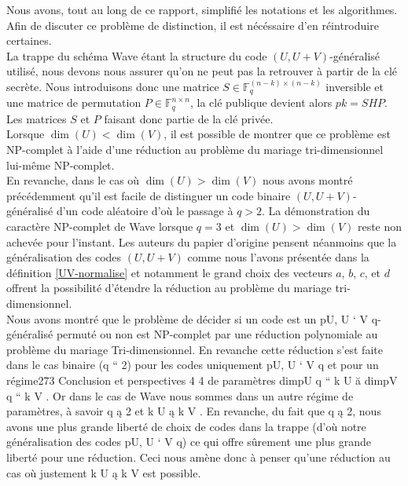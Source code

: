 \documentclass[12pt]{article}
\theoremstyle{plain}
\theoremstyle{definition}
\newcommand{\F}{\mathbb{F}}
\begin{document}
\noindent Nous avons, tout au long de ce rapport, simplifié les notations et les algorithmes. Afin de discuter ce problème de distinction, il est nécéssaire d'en réintroduire certaines. \\
La trappe du schéma Wave étant la structure du code $(U,U+V)$-généralisé utilisé, nous devons nous assurer qu'on ne peut pas la retrouver à partir de la clé secrète. Nous introduisons donc une matrice $S\in\F_q^{(n-k)\times(n-k)}$ inversible et une matrice de permutation $P\in\F_q^{n\times n}$, la clé publique devient alors $pk = SHP$. Les matrices $S$ et $P$ faisant donc partie de la clé privée.\\

\noindent Lorsque $\dim(U) < \dim(V)$, il est possible de montrer que ce problème est NP-complet à l'aide d'une réduction au problème du mariage tri-dimensionnel lui-même NP-complet. \\
En revanche, dans le cas où $\dim(U) > \dim(V)$ nous avons montré précédemment qu'il est facile de distinguer un code binaire $(U,U+V)$-généralisé d'un code aléatoire d'où le passage à $q>2$.
La démonstration du caractère NP-complet de Wave lorsque $q=3$ et $\dim(U) > \dim(V)$ reste non achevée pour l'instant.
Les auteurs du papier d'origine pensent néanmoins que la généralisation des codes $(U,U+V)$ comme nous l'avons présentée dans la définition \ref{UV-normalise} et notamment le grand choix des vecteurs $a$, $b$, $c$, et $d$ offrent la possibilité d'étendre la réduction au problème du mariage tri-dimensionnel.\\


Nous avons montré que le problème de décider si un code est un
pU, U ` V q-généralisé permuté ou non est NP-complet par une réduction polynomiale
au problème du mariage Tri-dimensionnel. En revanche cette réduction s’est faite
dans le cas binaire (q “ 2) pour les codes uniquement pU, U ` V q et pour un régime273
Conclusion et perspectives
4
4
de paramètres dimpU q “ k U ă dimpV q “ k V . Or dans le cas de Wave nous sommes
dans un autre régime de paramètres, à savoir q ą 2 et k U ą k V . En revanche, du fait
que q ą 2, nous avons une plus grande liberté de choix de codes dans la trappe (d’où
notre généralisation des codes pU, U ` V q) ce qui offre sûrement une plus grande
liberté pour une réduction. Ceci nous amène donc à penser qu’une réduction au cas
où justement k U ą k V est possible.
\end{document}
